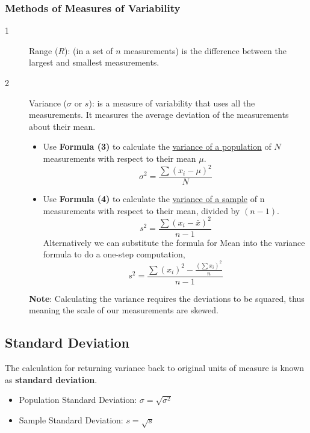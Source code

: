 \documentclass[12pt, letterpaper]{article}
\begin{document}
            \subsubsection{Methods of Measures of Variability}
                \begin{description}
                    \item[1] Range ($R$): (in a set of $n$ measurements) is the difference between the largest and smallest measurements.
                    \item[2] Variance ($\sigma$ or $s$): is a measure of variability that uses all the measurements. It measures the average deviation of the measurements about their mean.
                        \begin{itemize}
                            \item Use \textbf{Formula (3)} to calculate the \underline{variance of a population} of $N$ measurements with respect to their mean $\mu$. \smallskip
                                \begin{equation}
                                    \sigma^2 = \frac{\sum (x_i - \mu)^2}{N}
                                \end{equation}
                            \item Use \textbf{Formula (4)} to calculate the \underline{variance of a sample} of n measurements with respect to their mean, divided by $(n - 1)$. \smallskip
                                \begin{equation}
                                    s^2 = \frac{\sum (x_i - \bar{x})^2}{n - 1}
                                \end{equation}
                                Alternatively we can substitute the formula for Mean into the variance formula to do a one-step computation, \smallskip
                                \begin{equation}
                                    s^2 = \frac{\sum (x_i)^2 - \frac{(\sum x_i)^2}{n}}{n - 1}
                                \end{equation} 
                        \end{itemize}
                        \textbf{Note}: Calculating the variance requires the deviations to be squared, thus meaning the scale of our measurements are skewed.
                \end{description}
        
        \subsection{Standard Deviation}
            The calculation for returning variance back to original units of measure is known as \textbf{standard deviation}.
            \begin{itemize}
                \item Population Standard Deviation: $\sigma = \sqrt{\sigma^2}$
                \item Sample Standard Deviation: $s = \sqrt{s}$
            \end{itemize}
\end{document}
